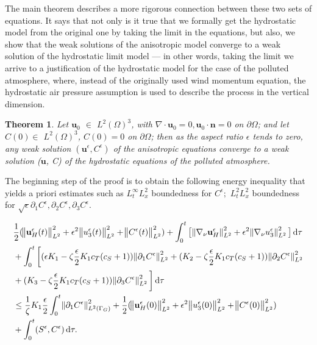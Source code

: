 \documentclass{article}
\newtheorem{theorem}{Theorem}
\newcommand*\diff{\mathop{}\!\mathrm{d}}
\begin{document}
The main theorem describes a more rigorous connection between these two sets of equations. It says that not only is it true that we formally get the hydrostatic model from the original one by taking the limit in the equations, but also, we show that the weak solutions of the anisotropic model converge to a weak solution of the hydrostatic limit model --- in other words, taking the limit we arrive to a justification of the hydrostatic model for the case of the polluted atmosphere, where, instead of the originally used wind momentum equation, the hydrostatic air pressure assumption is used to describe the process in the vertical dimension.

\begin{theorem}

Let $\mathbf{u}_0$ $\in$ $L^2 (\Omega)^3$, with $\nabla \cdot \mathbf{u}_0 = 0, \mathbf{u}_0 \cdot \mathbf{n} = 0$ on $\partial \Omega$; and let $C(0)\in$ $L^2 (\Omega)^3$, $C(0) = 0$ on $ \partial \Omega$; then as the aspect ratio $\epsilon$ tends to zero, any weak solution $(\mathbf{u}^\epsilon, C^\epsilon)$ of the anisotropic equations converge to a weak solution ($\mathbf{u}$, C) of the hydrostatic equations of the polluted atmosphere.

\end{theorem}

The beginning step of the proof is to obtain the following energy inequality that yields a priori estimates such as $L_t^\infty L_x^2$ boundedness for $C^\epsilon;$ $L_t^2 L_x^2$ boundedness for $\sqrt{\epsilon} \partial_1 C^\epsilon, \partial_2 C^\epsilon, \partial_3 C^\epsilon.$
    
  \begin{equation}
    \begin{split}  
    & \frac{1}{2} (\norm{\mathbf{u}_H^\epsilon (t)}_{L^2}^2 + \epsilon ^ 2 \norm{u_3^\epsilon (t)}_{L^2}^2 + \norm{C^\epsilon (t)}_{L^2}^2) + \int_0 ^ t \big [\norm{\nabla_\nu \mathbf{u}_H^\epsilon}_{L^2}^2 + \epsilon ^ 2 \norm{\nabla_\nu u_3^\epsilon}_{L^2}^2 \big ] \diff \tau \\
    & + \int_0 ^ t \bigg[ (\epsilon K_1 - \zeta \frac{\epsilon}{2} K_1 c_T (c_S + 1)) \norm{\partial_1 C^\epsilon}_{L^2}^2  + (K_2 - \zeta \frac{\epsilon}{2} K_1 c_T (c_S + 1)) \norm{\partial_2 C^\epsilon}_{L^2}^2 \\
    & + (K_3 - \zeta \frac{\epsilon}{2} K_1 c_T (c_S + 1)) \norm{\partial_3 C^\epsilon}_{L^2}^2 \bigg] \diff \tau \\
    & \leq \frac{1}{\zeta} K_1 \frac{\epsilon}{2} \int_0 ^ t \norm{\partial_1 C^\epsilon}^2 _{L^2 (\Gamma_G)} + \frac{1}{2} (\norm{\mathbf{u}_H^\epsilon (0)}_{L^2}^2 + \epsilon ^ 2 \norm{u_3^\epsilon (0)}_{L^2}^2 + \norm{C^\epsilon (0)}_{L^2}^2) \\
    & + \int_0^t (S^\epsilon,C^\epsilon) \diff \tau.
    \end{split}
  \end{equation}
  
\end{document}
